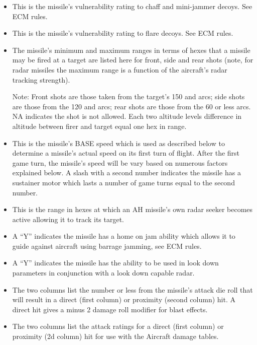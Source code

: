 \begin{itemize}
    \item {} This is the missile's vulnerability rating to chaff and mini-jammer decoys. See ECM rules.

    \item {} This is the missile's vulnerability rating to flare decoys. See ECM rules.

    \item {} The missile's minimum and maximum ranges in terms of hexes that a missile may be fired at a target are listed here for front, side and rear shots (note, for radar missiles the maximum range is a function of the aircraft's radar tracking strength).

    Note: Front shots are those taken from the target's 150 and  arcs; side shots are those from the 120 and  arcs; rear shots are those from the 60 or less arcs. NA indicates the shot is not allowed. Each two altitude levels difference in altitude between firer and target equal one hex in range. 

    \item {} This is the missile's BASE speed which is used as described below to determine a missile's actual speed on its first turn of flight. After the first game turn, the missile's speed will be vary based on numerous factors explained below. A slash with a second number indicates the missile has a sustainer motor which lasts a number of game turns equal to the second number.

    \item {} This is the range in hexes at which an AH missile's own radar seeker becomes active allowing it to track its target.

    \item {} A “Y” indicates the missile has a home on jam ability which allows it to guide against aircraft using barrage jamming, see ECM rules.

    \item {} A “Y” indicates the missile has the ability to be used in look down parameters in conjunction with a look down capable radar.

    \item {} The two columns list the number or less from the missile's attack die roll that will result in a direct (first column) or proximity (second column) hit. A direct hit gives a minus 2 damage roll modifier for blast effects.

    \item {} The two columns list the attack ratings for a direct (first column) or  proximity (2d column) hit for use with the Aircraft damage tables.

\end{itemize}

